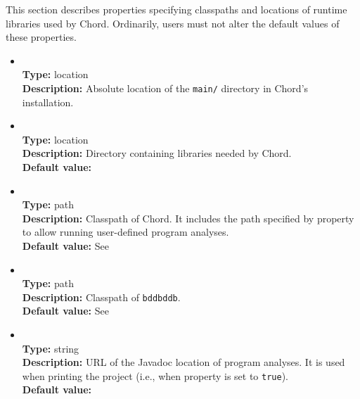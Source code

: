 This section describes properties specifying classpaths and locations of runtime libraries used by Chord.
Ordinarily, users must not alter the default values of these properties.

\begin{itemize}
\item
{} \\
{\bf Type:} location \\
{\bf Description:} Absolute location of the {\tt main/} directory in Chord's installation.

\item
{} \\
{\bf Type:} location \\
{\bf Description:} Directory containing libraries needed by Chord. \\
{\bf Default value:} 

\item
{} \\
{\bf Type:} path \\
{\bf Description:} Classpath of Chord.  It includes the path specified by property  to allow running user-defined program analyses. \\
{\bf Default value:} See  

\item
{} \\
{\bf Type:} path \\
{\bf Description:} Classpath of {\tt bddbddb}. \\
{\bf Default value:} See  

\item
{} \\
{\bf Type:} string \\
{\bf Description:} URL of the Javadoc location of program analyses.  It is used when printing the project (i.e., when property  is set to {\tt true}). \\
{\bf Default value:} 
\end{itemize}

